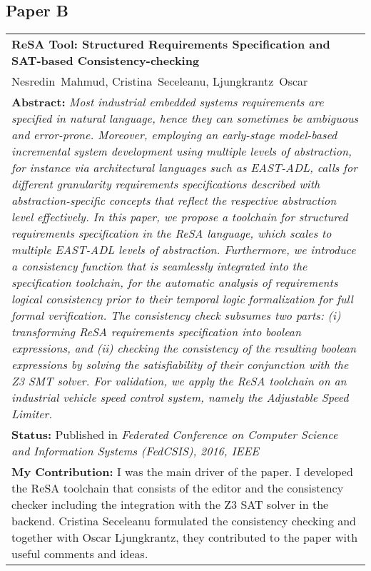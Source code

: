 \subsection{Paper B}
\begin{tabular}{p{\textwidth}}
\textbf{ReSA Tool: Structured Requirements Specification and SAT-based Consistency-checking}\\%
Nesredin~Mahmud, Cristina~Seceleanu, Ljungkrantz~Oscar\\[6pt]%
\textbf{Abstract:} \textit{Most industrial embedded systems requirements are
specified in natural language, hence they can sometimes be
ambiguous and error-prone. Moreover, employing an early-stage
model-based incremental system development using multiple
levels of abstraction, for instance via architectural languages
such as EAST-ADL, calls for different granularity requirements
specifications described with abstraction-specific concepts that
reflect the respective abstraction level effectively.
In this paper, we propose a toolchain for structured requirements
specification in the ReSA language, which scales to multiple
EAST-ADL levels of abstraction. Furthermore, we introduce
a consistency function that is seamlessly integrated into the
specification toolchain, for the automatic analysis of requirements
logical consistency prior to their temporal logic formalization
for full formal verification. The consistency check subsumes
two parts: (i) transforming ReSA requirements specification into
boolean expressions, and (ii) checking the consistency of the
resulting boolean expressions by solving the satisfiability of their
conjunction with the Z3 SMT solver. For validation, we apply
the ReSA toolchain on an industrial vehicle speed control system,
namely the Adjustable Speed Limiter.}\\[6pt]%
\textbf{Status: }Published in \textit{Federated Conference on Computer Science and Information Systems (FedCSIS), 2016, IEEE}\\%
\textbf{My Contribution: }I was the main driver of the paper. I developed the ReSA toolchain that consists of the editor and the consistency checker including the integration with the Z3 SAT solver in the backend. Cristina Seceleanu formulated the consistency checking and together with Oscar Ljungkrantz, they contributed to the paper with useful comments and ideas.\\%
\end{tabular}

